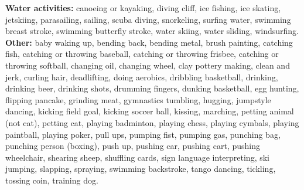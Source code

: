 \documentclass{article} \usepackage{iclr2024_conference,times}
\begin{document}
\textbf{Water activities:} canoeing or kayaking, diving cliff, ice fishing, ice skating, jetskiing, parasailing, sailing, scuba diving, snorkeling, surfing water, swimming breast stroke, swimming butterfly stroke, water skiing, water sliding, windsurfing.\\
\textbf{Other:} baby waking up, bending back, bending metal, brush painting, catching fish, catching or throwing baseball, catching or throwing frisbee, catching or throwing softball, changing oil, changing wheel, clay pottery making, clean and jerk, curling hair, deadlifting, doing aerobics, dribbling basketball, drinking, drinking beer, drinking shots, drumming fingers, dunking basketball, egg hunting, flipping pancake, grinding meat, gymnastics tumbling, hugging, jumpstyle dancing, kicking field goal, kicking soccer ball, kissing, marching, petting animal (not cat), petting cat, playing badminton, playing chess, playing cymbals, playing paintball, playing poker, pull ups, pumping fist, pumping gas, punching bag, punching person (boxing), push up, pushing car, pushing cart, pushing wheelchair, shearing sheep, shuffling cards,  sign language interpreting, ski jumping, slapping, spraying, swimming backstroke, tango dancing, tickling, tossing  coin, training dog.
\end{document}

